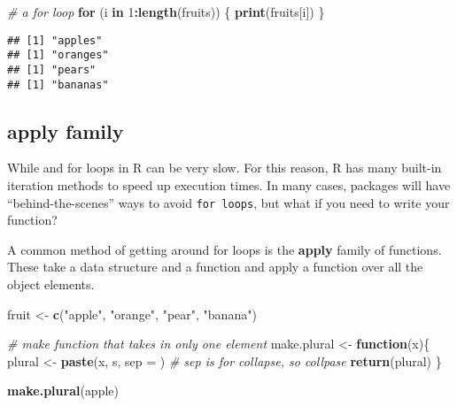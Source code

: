 \documentclass[
]{book}
\newenvironment{Shaded}{\begin{snugshade}}{\end{snugshade}}
\newcommand{\CommentTok}[1]{\textcolor[rgb]{0.56,0.35,0.01}{\textit{#1}}}
\newcommand{\ControlFlowTok}[1]{\textcolor[rgb]{0.13,0.29,0.53}{\textbf{#1}}}
\newcommand{\DataTypeTok}[1]{\textcolor[rgb]{0.13,0.29,0.53}{#1}}
\newcommand{\DecValTok}[1]{\textcolor[rgb]{0.00,0.00,0.81}{#1}}
\newcommand{\KeywordTok}[1]{\textcolor[rgb]{0.13,0.29,0.53}{\textbf{#1}}}
\newcommand{\NormalTok}[1]{#1}
\newcommand{\OperatorTok}[1]{\textcolor[rgb]{0.81,0.36,0.00}{\textbf{#1}}}
\newcommand{\StringTok}[1]{\textcolor[rgb]{0.31,0.60,0.02}{#1}}
\begin{document}
\begin{Shaded}
\begin{Highlighting}[]
\CommentTok{\# a for loop}
\ControlFlowTok{for}\NormalTok{ (i }\ControlFlowTok{in} \DecValTok{1}\OperatorTok{:}\KeywordTok{length}\NormalTok{(fruits)) \{}
  \KeywordTok{print}\NormalTok{(fruits[i])}
\NormalTok{\}}
\end{Highlighting}
\end{Shaded}

\begin{verbatim}
## [1] "apples"
## [1] "oranges"
## [1] "pears"
## [1] "bananas"
\end{verbatim}

\hypertarget{apply-family}{%
\subsection{apply family}\label{apply-family}}

While and for loops in R can be very slow. For this reason, R has many built-in iteration methods to speed up execution times. In many cases, packages will have ``behind-the-scenes'' ways to avoid \texttt{for\ loops}, but what if you need to write your function?

A common method of getting around for loops is the \textbf{apply} family of functions. These take a data structure and a function and apply a function over all the object elements.

\begin{Shaded}
\begin{Highlighting}[]
\NormalTok{fruit \textless{}{-}}\StringTok{ }\KeywordTok{c}\NormalTok{(}\StringTok{"apple"}\NormalTok{, }\StringTok{"orange"}\NormalTok{, }\StringTok{"pear"}\NormalTok{, }\StringTok{"banana"}\NormalTok{)}

\CommentTok{\# make function that takes in only one element}
\NormalTok{make.plural \textless{}{-}}\StringTok{ }\ControlFlowTok{function}\NormalTok{(x)\{}
\NormalTok{   plural \textless{}{-}}\StringTok{ }\KeywordTok{paste}\NormalTok{(x, }\StringTok{\textquotesingle{}s\textquotesingle{}}\NormalTok{, }\DataTypeTok{sep =} \StringTok{\textquotesingle{}\textquotesingle{}}\NormalTok{) }\CommentTok{\# sep is for collapse, so collpase \textquotesingle{}\textquotesingle{}}
   \KeywordTok{return}\NormalTok{(plural)}
\NormalTok{\}}

\KeywordTok{make.plural}\NormalTok{(}\StringTok{\textquotesingle{}apple\textquotesingle{}}\NormalTok{)}
\end{Highlighting}
\end{Shaded}
\end{document}
